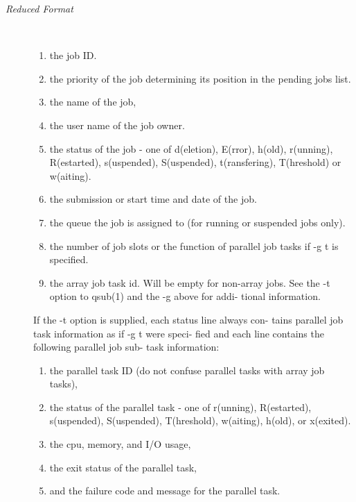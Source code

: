 \documentclass[11pt,final,oneside]{fithesis}
\begin{document}
\begin{description}
\item[\emph{Reduced Format}]
\\
\begin{enumerate}
\item[]the job ID.
\item[]the priority of the job determining its position  in  the
        pending  jobs  list.
\item[] the name of the job,
\item[] the user name of the job owner.
\item[] the status of the  job  -  one  of  d(eletion),  E(rror),
        h(old), r(unning), R(estarted), s(uspended), S(uspended),
        t(ransfering), T(hreshold) or w(aiting).
\item[] the submission or start time and date of the job.
\item[] the  queue  the  job  is  assigned  to  (for  running  or
        suspended jobs only).
\item[] the number of job slots or the function of  parallel  job
        tasks if -g t is specified.
\item[] the array job task id. Will be empty for non-array  jobs.
        See  the  -t option to qsub(1) and the -g above for addi-
        tional information.
\end{enumerate}
     If the -t option is supplied, each status line  always  con-
     tains  parallel  job task information as if -g t were speci-
     fied and each line contains the following parallel job  sub-
     task information:
\begin{enumerate}
\item[] the parallel task ID (do not confuse parallel tasks  with
        array job tasks),
\item[] the status of the  parallel  task  -  one  of  r(unning),
        R(estarted),   s(uspended),   S(uspended),   T(hreshold),
        w(aiting), h(old), or x(exited).
\item[] the cpu, memory, and I/O usage,
\item[] the exit status of the parallel task,
\item[] and the failure code and message for the parallel task.
\end{enumerate}


\end{description}
\end{document}
